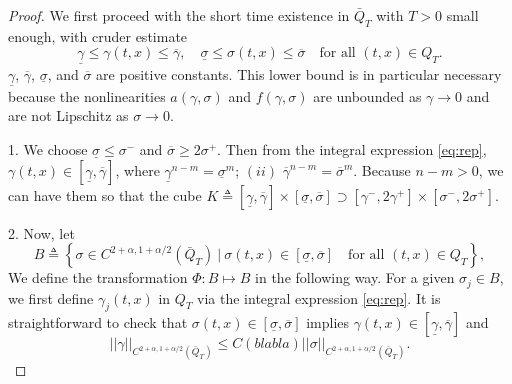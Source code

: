 \documentclass[a4paper,11pt]{article}
\def\blue{\color{blue}}
\newtheorem{proposition}{Proposition}[section]
\theoremstyle{remark}
\begin{document}
\begin{proof}
We first proceed with the short time existence in $\bar{Q}_{T}$ with $T>0$ small enough, with cruder estimate
\begin{equation}\underline\gamma \le \gamma(t,x) \le \overline\gamma, \quad \underline\sigma \le \sigma(t,x) \le \overline\sigma \quad \text{for all $(t,x)\in Q_T$}.\label{eq:cruder} \end{equation}
$\underline\gamma$, $\overline\gamma$, $\underline\sigma$, and $\overline\sigma$ are positive constants. This lower bound is in particular necessary because the nonlinearities $a(\gamma,\sigma)$ and $f(\gamma,\sigma)$ are unbounded as $\gamma \rightarrow 0$ and are not Lipschitz as $\sigma \rightarrow 0$. 

1. We choose $\underline{\sigma}\le \sigma^-$ and $\overline{\sigma}\ge 2\sigma^+$. Then from the integral expression \eqref{eq:rep}, $\gamma(t,x) \in [\underline{\gamma},\overline\gamma]$, where $\underline\gamma^{n-m} = \underline\sigma^m$; $(ii)$ $\overline\gamma^{n-m} = \overline\sigma^m$. Because $n-m>0$, we can have them so that the cube $K\triangleq[\underline{\gamma},\overline{\gamma}]\times[\underline\sigma,\overline\sigma] \supset [\gamma^-,2\gamma^+]\times[\sigma^-,2\sigma^+]$.
% 
% 



2. Now, let $$B\triangleq\left\{\sigma \in C^{2+\alpha,1+\alpha/2}(\bar{Q}_T) ~\Big|~ \sigma(t,x) \in [\underline\sigma, \overline\sigma] \quad \text{for all $(t,x)\in Q_T$}\right\},$$ 
We define the transformation $\Phi: B \mapsto B$ in the following way. For a given $\sigma_j \in B$, we first define $\gamma_j(t,x)$ in $Q_T$ via the integral expression \eqref{eq:rep}. It is straightforward to check that $\sigma(t,x)\in [\underline\sigma,\overline\sigma]$ implies $\gamma(t,x) \in [\underline\gamma,\overline\gamma]$ and 
{\blue$$||\gamma||_{C^{2+\alpha,1+\alpha/2}(\bar{Q}_T)} \le C(blabla)||\sigma||_{C^{2+\alpha,1+\alpha/2}(\bar{Q}_T)}.$$}


\end{proof}
\end{document}
